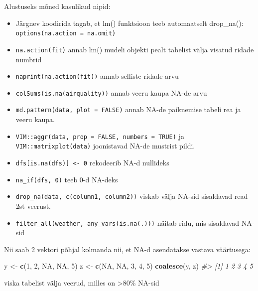 \documentclass[]{book}
\newenvironment{Shaded}{\begin{snugshade}}{\end{snugshade}}
\newcommand{\CommentTok}[1]{\textcolor[rgb]{0.56,0.35,0.01}{\textit{#1}}}
\newcommand{\DecValTok}[1]{\textcolor[rgb]{0.00,0.00,0.81}{#1}}
\newcommand{\KeywordTok}[1]{\textcolor[rgb]{0.13,0.29,0.53}{\textbf{#1}}}
\newcommand{\NormalTok}[1]{#1}
\newcommand{\OtherTok}[1]{\textcolor[rgb]{0.56,0.35,0.01}{#1}}
\newcommand{\StringTok}[1]{\textcolor[rgb]{0.31,0.60,0.02}{#1}}
\begin{document}
Alustuseks mõned kasulikud nipid:

\begin{itemize}
\item
  Järgnev koodirida tagab, et lm() funktsioon teeb automaatselt drop\_na():
  \texttt{options(na.action\ =\ na.omit)}
\item
  \texttt{na.action(fit)} annab lm() mudeli objekti pealt tabelist välja visatud ridade numbrid
\item
  \texttt{naprint(na.action(fit))} annab selliste ridade arvu
\item
  \texttt{colSums(is.na(airquality))} annab veeru kaupa NA-de arvu
\item
  \texttt{md.pattern(data,\ plot\ =\ FALSE)} annab NA-de paiknemise tabeli rea ja veeru kaupa.
\item
  \texttt{VIM::aggr(data,\ prop\ =\ FALSE,\ numbers\ =\ TRUE)} ja \texttt{VIM::matrixplot(data)} joonistavad NA-de mustrist pildi.
\item
  \texttt{dfs{[}is.na(dfs){]}\ \textless{}-\ 0} rekodeerib NA-d nullideks
\item
  \texttt{na\_if(dfs,\ 0)} teeb 0-d NA-deks
\item
  \texttt{drop\_na(data,\ c(column1,\ column2))} viskab välja NA-sid sisaldavad read 2st veerust.
\item
  \texttt{filter\_all(weather,\ any\_vars(is.na(.)))} näitab ridu, mis sisaldavad NA-sid
\end{itemize}

Nii saab 2 vektori põhjal kolmanda nii, et NA-d asendatakse vastava väärtusega:

\begin{Shaded}
\begin{Highlighting}[]
\NormalTok{y <-}\StringTok{ }\KeywordTok{c}\NormalTok{(}\DecValTok{1}\NormalTok{, }\DecValTok{2}\NormalTok{, }\OtherTok{NA}\NormalTok{, }\OtherTok{NA}\NormalTok{, }\DecValTok{5}\NormalTok{)}
\NormalTok{z <-}\StringTok{ }\KeywordTok{c}\NormalTok{(}\OtherTok{NA}\NormalTok{, }\OtherTok{NA}\NormalTok{, }\DecValTok{3}\NormalTok{, }\DecValTok{4}\NormalTok{, }\DecValTok{5}\NormalTok{)}
\KeywordTok{coalesce}\NormalTok{(y, z)}
\CommentTok{#> [1] 1 2 3 4 5}
\end{Highlighting}
\end{Shaded}

viska tabelist välja veerud, milles on \textgreater{}80\% NA-sid
\end{document}
